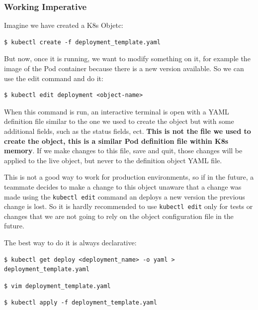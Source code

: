 \documentclass{article}
\newenvironment{codetemplate}[1][]{%
  \mybasecolorbox[#1]
  \itshape
}{%
  \endmybasecolorbox
}
\begin{document}
\subsubsection{Working Imperative}

Imagine we have created a K8s Objetc:

\begin{codetemplate}{}
\begin{verbatim}
$ kubectl create -f deployment_template.yaml
\end{verbatim}
\end{codetemplate}

But now, once it is running, we want to modify something on it, for example the image of the Pod container because there is a new version available. So we can use the edit command and do it:

\begin{codetemplate}{}
\begin{verbatim}
$ kubectl edit deployment <object-name>
\end{verbatim}
\end{codetemplate}

When this command is run, an interactive terminal is open with a YAML definition file similar to the one we used to create the object but with some additional fields, such as the status fields, ect. \textbf{This is not the file we used to create the object, this is a similar Pod definition file within K8s memory}. If we make changes to this file, save and quit, those changes will be applied to the live object, but never to the definition object YAML file.

This is not a good way to work for production environments, so if in the future, a teammate decides to make a change to this object unaware that a change was made using the \verb|kubectl edit| command an deploys a new version the previous change is lost. So it is hardly recommended to use \verb|kubectl edit| only for tests or changes that we are not going to rely on the object configuration file in the future.

The best way to do it is always declarative:
\begin{codetemplate}{}
\begin{verbatim}
$ kubectl get deploy <deployment_name> -o yaml > deployment_template.yaml
\end{verbatim}
\end{codetemplate}
\begin{codetemplate}{}
\begin{verbatim}
$ vim deployment_template.yaml
\end{verbatim}
\end{codetemplate}
\begin{codetemplate}{}
\begin{verbatim}
$ kubectl apply -f deployment_template.yaml
\end{verbatim}
\end{codetemplate}
\end{document}
